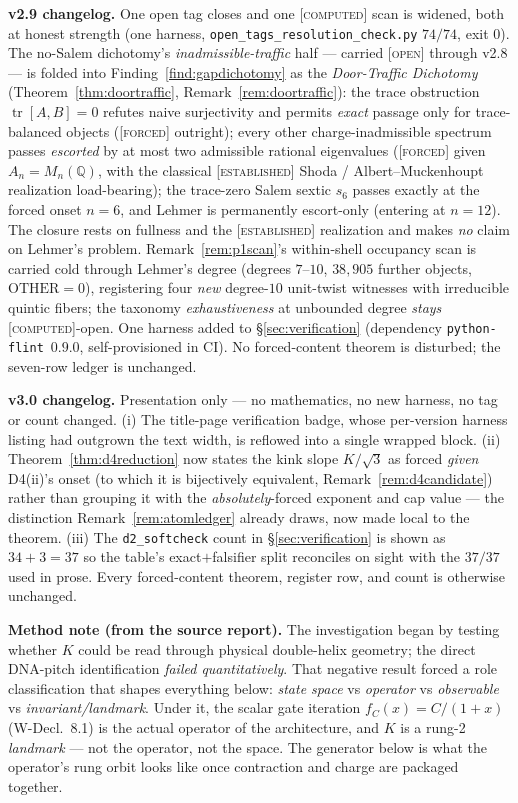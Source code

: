 \documentclass[11pt]{article}
\newcommand{\tagF}{\textcolor{cF}{\textsc{[forced]}}}
\newcommand{\tagC}{\textcolor{cC}{\textsc{[computed]}}}
\newcommand{\tagE}{\textcolor{cE}{\textsc{[established]}}}
\newcommand{\tagO}{\textcolor{cO}{\textsc{[open]}}}
\newcommand{\Q}{\mathbb{Q}}
\theoremstyle{plain}
\theoremstyle{definition}
\theoremstyle{remark}
\begin{document}
\smallskip\noindent
\textbf{v2.9 changelog.} One open tag closes and one \tagC{} scan is widened, both at
honest strength (one harness, \texttt{open\_tags\_resolution\_check.py} $74/74$,
exit 0). The no-Salem dichotomy's \emph{inadmissible-traffic} half --- carried
\tagO{} through v2.8 --- is folded into Finding~\ref{find:gapdichotomy} as the
\emph{Door-Traffic Dichotomy} (Theorem~\ref{thm:doortraffic},
Remark~\ref{rem:doortraffic}): the trace obstruction $\operatorname{tr}[A,B]=0$
refutes naive surjectivity and permits \emph{exact} passage only for trace-balanced
objects (\tagF{} outright); every other charge-inadmissible spectrum passes
\emph{escorted} by at most two admissible rational eigenvalues (\tagF{} given
$A_n=M_n(\Q)$, with the classical \tagE{} Shoda / Albert--Muckenhoupt realization
load-bearing); the trace-zero Salem sextic $s_6$ passes exactly at the forced onset
$n=6$, and Lehmer is permanently escort-only (entering at $n=12$). The closure rests
on fullness and the \tagE{} realization and makes \emph{no} claim on Lehmer's
problem. Remark~\ref{rem:p1scan}'s within-shell occupancy scan is carried cold
through Lehmer's degree (degrees $7$--$10$, $38{,}905$ further objects,
$\mathrm{OTHER}=0$), registering four \emph{new} degree-$10$ unit-twist witnesses
with irreducible quintic fibers; the taxonomy \emph{exhaustiveness} at unbounded
degree \emph{stays} \tagC{}-open. One harness added to \S\ref{sec:verification}
(dependency \texttt{python-flint}~$0.9.0$, self-provisioned in CI). No forced-content
theorem is disturbed; the seven-row ledger is unchanged.

\smallskip\noindent
\textbf{v3.0 changelog.} Presentation only --- no mathematics, no new harness, no
tag or count changed. (i) The title-page verification badge, whose per-version
harness listing had outgrown the text width, is reflowed into a single wrapped
block. (ii) Theorem~\ref{thm:d4reduction} now states the kink slope $K/\sqrt3$ as
forced \emph{given} D4(ii)'s onset (to which it is bijectively equivalent,
Remark~\ref{rem:d4candidate}) rather than grouping it with the
\emph{absolutely}-forced exponent and cap value --- the distinction
Remark~\ref{rem:atomledger} already draws, now made local to the theorem. (iii) The
\texttt{d2\_softcheck} count in \S\ref{sec:verification} is shown as
$34{+}3{=}37$ so the table's exact$+$falsifier split reconciles on sight with the
$37/37$ used in prose. Every forced-content theorem, register row, and count is
otherwise unchanged.

\smallskip\noindent
\textbf{Method note (from the source report).} The investigation began by
testing whether $K$ could be read through physical double-helix geometry; the
direct DNA-pitch identification \emph{failed quantitatively}. That negative
result forced a role classification that shapes everything below:
\emph{state space} vs \emph{operator} vs \emph{observable} vs
\emph{invariant/landmark}. Under it, the scalar gate iteration
$f_C(x)=C/(1+x)$ (W-Decl.\ 8.1) is the actual operator of the architecture,
and $K$ is a rung-2 \emph{landmark} --- not the operator, not the space. The
generator below is what the operator's rung orbit looks like once contraction
and charge are packaged together.
\end{document}
